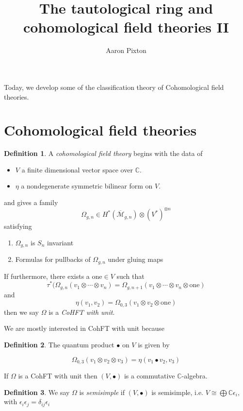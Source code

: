 \documentclass{amsart}
\title{The tautological ring and cohomological field theories II}
\author{Aaron Pixton}
\theoremstyle{definition}
\newtheorem{definition}{Definition}
\newcommand{\C}{\mathbb{C}}
\newcommand{\one}{\text{one}}
\newcommand{\Mbar}{\overline{\mathcal{M}}}
\begin{document}
\maketitle

Today, we develop some of the classification theory of Cohomological field theories.

\section{Cohomological field theories}

\begin{definition}
A \emph{cohomological field theory} begins with the data of 
\begin{itemize}
\item $V$ a finite dimensional vector space over $\C$.
\item $\eta$ a nondegenerate symmetric bilinear form on $V$. 
\end{itemize}
and gives a family
$$\Omega_{g,n}\in H^*(\Mbar_{g,n})\otimes (V^*)^{\otimes n}$$
satisfying
\begin{enumerate}
\item $\Omega_{g,n}$ is $S_n$ invariant
\item Formulas for pullbacks of $\Omega_{g,n}$ under gluing maps
\end{enumerate}

If furthermore, there exists a $\one\in V$ such that 
$$\tau^*(\Omega_{g,n}(v_1\otimes\cdots\otimes v_n)=\Omega_{g,n+1}(v_1\otimes\cdots\otimes v_n\otimes\one)$$
and
$$\eta(v_1,v_2)=\Omega_{0,3}(v_1\otimes v_2\otimes\one)$$
then we say $\Omega$ is a \emph{CoHFT with unit}.
\end{definition}

We are mostly interested in CohFT with unit because

\begin{definition}
The quantum product $\bullet$ on $V$ is given by

$$\Omega_{0,3}(v_1\otimes v_2\otimes v_3)=\eta(v_1\bullet v_2,v_3)$$
\end{definition}

If $\Omega$ is a CohFT with unit then $(V,\bullet)$ is a commutative $\C$-algebra.

\begin{definition}
We say $\Omega$ is \emph{semisimple} if $(V,\bullet)$ is semisimple, i.e. $V\cong \bigoplus\C\epsilon_i$, with $\epsilon_i\epsilon_j=\delta_{ij}\epsilon_i$
\end{definition}
\end{document}
